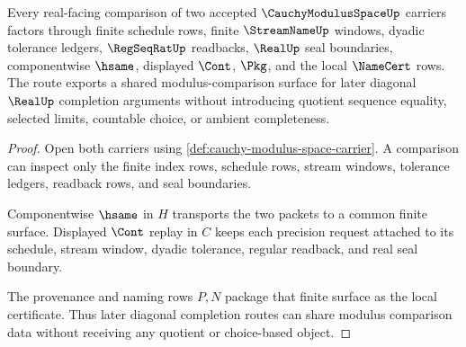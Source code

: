 \begin{theorem}
\label{thm:cauchy-modulus-space-finite-route}
Every real-facing comparison of two accepted $\CauchyModulusSpaceUp$ carriers
factors through finite schedule rows, finite $\StreamNameUp$ windows, dyadic
tolerance ledgers, $\RegSeqRatUp$ readbacks, $\RealUp$ seal boundaries,
componentwise $\hsame$, displayed $\Cont$, $\Pkg$, and the local $\NameCert$
rows. The route exports a shared modulus-comparison surface for later
diagonal $\RealUp$ completion arguments without introducing quotient sequence
equality, selected limits, countable choice, or ambient completeness.
\end{theorem}
\begin{proof}
Open both carriers using
\autoref{def:cauchy-modulus-space-carrier}. A comparison can inspect only the
finite index rows, schedule rows, stream windows, tolerance ledgers, readback
rows, and seal boundaries.

Componentwise $\hsame$ in $H$ transports the two packets to a common finite
surface. Displayed $\Cont$ replay in $C$ keeps each precision request attached
to its schedule, stream window, dyadic tolerance, regular readback, and real
seal boundary.

The provenance and naming rows $P,N$ package that finite surface as the local
certificate. Thus later diagonal completion routes can share modulus comparison
data without receiving any quotient or choice-based object.
\end{proof}

